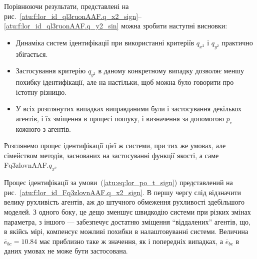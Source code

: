 Порівнюючи результати, представлені на
рис.~\ref{atu:f:lor_id_ql3ruonAAF.q_x2_sign}--\ref{atu:f:lor_id_ql3ruonAAF.q_y2_sin} можна зробити
наступні висновки:

\begin{itemize}

  \item
   Динаміка систем ідентифікації при використанні критеріїв $ q_{x^2} $ і $ q_{y^2} $ практично збігається.

  \item
    Застосування критерію
    $ q_{y^2} $ в даному конкретному випадку дозволяє меншу похибку
    ідентифікації, але на настільки, щоб можна було говорити про
    істотну різницю.

  \item
    У всіх розглянутих випадках виправданими були і застосування
    декількох агентів, і їх зміщення в процесі пошуку, і визначення
    за допомогою
    $p_e$ кожного з агентів.

\end{itemize}

Розглянемо процес ідентифікації цієї ж системи, при тих же
умовах, але сімейством методів, заснованих на застосуванні
функції якості, а саме
Fq3zlovnAAF.$q_{x^2}$

Процес ідентифікації за умови~(\ref{atu:eq:lor_po_t_sign}) представлений
на рис.~\ref{atu:f:lor_id_Fq3zlovnAAF.q_x2_sign}. В першу чергу слід відзначити
велику рухливість агентів, аж до штучного обмеження рухливості
здебільшого моделей. З одного боку, це дещо зменшує швидкодію
системи при різких змінах параметра, з іншого --- забезпечує
достатню зміщення ``віддалених'' агентів, що, в якійсь мірі,
компенсує можливі похибки в налаштовуванні системи. Величина
$ \overline{e}_{bc} = 10.84 $ має приблизно таке ж значення, як і попередніх
випадках, а
$ \overline{e}_{be} $ в даних умовах не може бути застосована.

